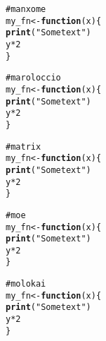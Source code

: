 \documentclass[12pt]{article}\usepackage{graphicx, color}
\makeatletter
\newcommand{\hlfunctioncall}[1]{\textcolor[rgb]{0.188235294117647,0.650980392156863,0.188235294117647}{\textbf{#1}}}%
\newcommand{\hlstring}[1]{\textcolor[rgb]{0.850980392156863,1,0.466666666666667}{#1}}%
\newcommand{\hlcomment}[1]{\textcolor[rgb]{0.533333333333333,0.533333333333333,0.533333333333333}{#1}}%
\newenvironment{kframe}{%
 \def\at@end@of@kframe{}%
 \ifinner\ifhmode%
  \def\at@end@of@kframe{\end{minipage}}%
  \begin{minipage}{\columnwidth}%
 \fi\fi%
 \def\FrameCommand##1{\hskip\@totalleftmargin \hskip-\fboxsep
 \colorbox{shadecolor}{##1}\hskip-\fboxsep
     \hskip-\linewidth \hskip-\@totalleftmargin \hskip\columnwidth}%
 \MakeFramed {\advance\hsize-\width
   \@totalleftmargin\z@ \linewidth\hsize
   \@setminipage}}%
 {\par\unskip\endMakeFramed%
 \at@end@of@kframe}
\newenvironment{knitrout}{}{} %
\makeatother
\begin{document}
\begin{knitrout}
\color{fgcolor}\begin{kframe}
\begin{alltt}
\hlcomment{# manxome}
my_fn <- \hlfunctioncall{function}(x) \{
    \hlfunctioncall{print}(\hlstring{"Some text"})
    y * 2
\}
\end{alltt}
\end{kframe}
\end{knitrout}





\begin{knitrout}
\color{fgcolor}\begin{kframe}
\begin{alltt}
\hlcomment{# maroloccio}
my_fn <- \hlfunctioncall{function}(x) \{
    \hlfunctioncall{print}(\hlstring{"Some text"})
    y * 2
\}
\end{alltt}
\end{kframe}
\end{knitrout}





\begin{knitrout}
\color{fgcolor}\begin{kframe}
\begin{alltt}
\hlcomment{# matrix}
my_fn <- \hlfunctioncall{function}(x) \{
    \hlfunctioncall{print}(\hlstring{"Some text"})
    y * 2
\}
\end{alltt}
\end{kframe}
\end{knitrout}





\begin{knitrout}
\color{fgcolor}\begin{kframe}
\begin{alltt}
\hlcomment{# moe}
my_fn <- \hlfunctioncall{function}(x) \{
    \hlfunctioncall{print}(\hlstring{"Some text"})
    y * 2
\}
\end{alltt}
\end{kframe}
\end{knitrout}





\begin{knitrout}
\color{fgcolor}\begin{kframe}
\begin{alltt}
\hlcomment{# molokai}
my_fn <- \hlfunctioncall{function}(x) \{
    \hlfunctioncall{print}(\hlstring{"Some text"})
    y * 2
\}
\end{alltt}
\end{kframe}
\end{knitrout}
\end{document}
